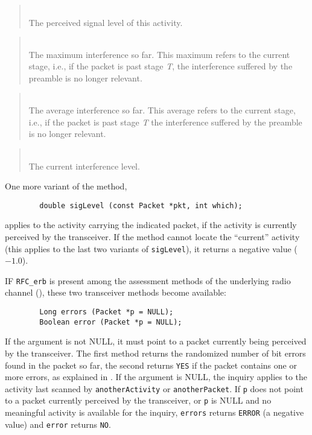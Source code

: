 \begin{quote}
\noindent{}\\ \hspace{0in}
The perceived signal level of this activity.
\end{quote}

\begin{quote}
\noindent{}\\ \hspace{0in}
The maximum interference so far.
This maximum refers to the current stage, i.e.,
if the packet is past stage {\em T}, the interference suffered
by the preamble is no longer relevant.
\end{quote}

\begin{quote}
\noindent{}\\ \hspace{0in}
The average interference so far.
This average refers to the current stage, i.e.,
if the packet is past stage {\em T\/} the interference suffered
by the preamble is no longer relevant.
\end{quote}

\begin{quote}
\noindent{}\\ \hspace{0in}
The current interference level.
\end{quote}

One more variant of the method,
\begin{verbatim}
        double sigLevel (const Packet *pkt, int which);
\end{verbatim}
\noindent
applies to the activity carrying the indicated packet, if the activity is
currently perceived by the transceiver.
If the method cannot locate the ``current'' activity (this applies to the
last two variants of {\tt sigLevel}), it returns a negative value ($-1.0$).

IF {\tt RFC\_erb} is present among the assessment methods of the underlying
radio channel (), these two transceiver methods
become available:
\begin{verbatim}
        Long errors (Packet *p = NULL);
        Boolean error (Packet *p = NULL);
\end{verbatim}
If the argument is not NULL, it must point to a packet currently being
perceived by the transceiver.
The first method returns the randomized number of bit errors found in the
packet so far, the second returns {\tt YES} if the packet contains one or more
errors, as explained in .
If the argument is NULL, the inquiry applies to the activity last scanned by
{\tt anotherActivity} or {\tt anotherPacket}.
If {\tt p} does not point to a packet currently perceived by the transceiver,
or {\tt p} is NULL and no meaningful activity is available for the inquiry,
{\tt errors} returns {\tt ERROR} (a negative value) and {\tt error} returns
{\tt NO}.

